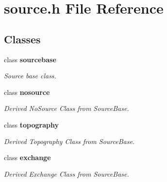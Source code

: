\section{source.\-h File Reference}
\label{source_8h}
\subsection*{Classes}
\begin{DoxyCompactItemize}
\item 
class {\bf sourcebase}
\begin{DoxyCompactList}\small\item\em Source base class. \end{DoxyCompactList}\item 
class {\bf nosource}
\begin{DoxyCompactList}\small\item\em Derived No\-Source Class from Source\-Base. \end{DoxyCompactList}\item 
class {\bf topography}
\begin{DoxyCompactList}\small\item\em Derived Topography Class from Source\-Base. \end{DoxyCompactList}\item 
class {\bf exchange}
\begin{DoxyCompactList}\small\item\em Derived Exchange Class from Source\-Base. \end{DoxyCompactList}\end{DoxyCompactItemize}
